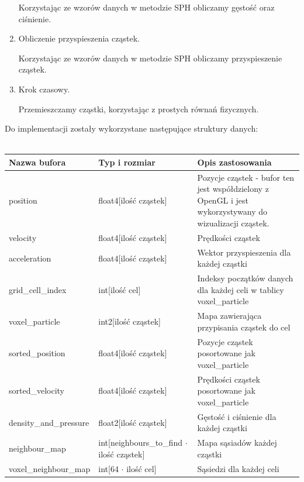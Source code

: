 \documentclass[polish, 12pt]{aghthesis}
\begin{document}
\begin{enumerate}
				Korzystając ze wzorów danych w metodzie SPH obliczamy gęstość oraz ciśnienie.
			\item{Obliczenie przyspieszenia cząstek}.
			
				Korzystając ze wzorów danych w metodzie SPH obliczamy przyspieszenie cząstek.
			\item{Krok czasowy}.
			
				Przemieszczamy cząstki, korzystając z prostych równań fizycznych.
				
			\end{enumerate}
			
			Do implementacji zostały wykorzystane następujące struktury danych:
			\ \\
			\ \\
			\begin{tabular}{| p{} | p{} | p{} |}
				\hline
					Nazwa bufora & Typ i rozmiar & Opis zastosowania \\
				\hline
					position & float4[ilość cząstek] & Pozycje cząstek - bufor ten jest współdzielony z OpenGL i jest wykorzystywany do wizualizacji cząstek. \\
				\hline
					velocity & float4[ilość cząstek] & Prędkości cząstek \\
				\hline
					acceleration & float4[ilość cząstek] & Wektor przyspieszenia dla każdej cząstki\\
				\hline
					grid\_cell\_index & int[ilość cel] & Indeksy początków danych dla każdej celi w tablicy voxel\_particle \\
				\hline
					voxel\_particle & int2[ilość cząstek] & Mapa zawierająca przypisania cząstek do cel \\ 
				\hline
					sorted\_position & float4[ilość cząstek] & Pozycje cząstek posortowane jak voxel\_particle\\
				\hline
					sorted\_velocity & float4[ilość cząstek] & Prędkości cząstek posortowane jak voxel\_particle\\
				\hline
					density\_and\_pressure & float2[ilość cząstek] & Gęstość i ciśnienie dla każdej cząstki\\
				\hline
					neighbour\_map & int[neighbours\_to\_find ${\cdot}$ ilość cząstek] & Mapa sąsiadów każdej cząstki\\
				\hline
					voxel\_neighbour\_map & int[64 ${\cdot}$ ilość cel] & Sąsiedzi dla każdej celi \\
				\hline
			\end{tabular}
\end{document}
